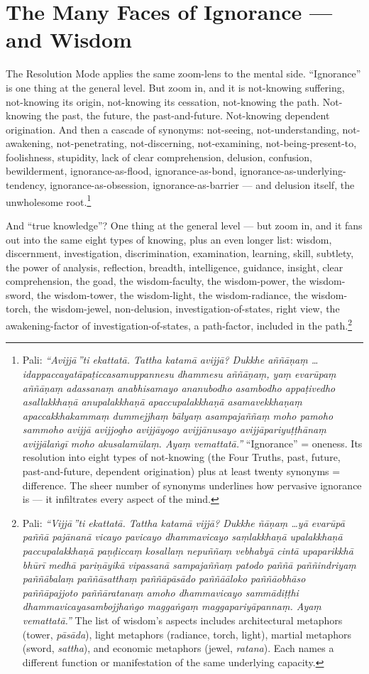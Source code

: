\section*{The Many Faces of Ignorance --- and Wisdom}

The Resolution Mode applies the same zoom-lens to the mental side. ``Ignorance'' is one thing at the general level. But zoom in, and it is not-knowing suffering, not-knowing its origin, not-knowing its cessation, not-knowing the path. Not-knowing the past, the future, the past-and-future. Not-knowing dependent origination. And then a cascade of synonyms: not-seeing, not-understanding, not-awakening, not-penetrating, not-discerning, not-examining, not-being-present-to, foolishness, stupidity, lack of clear comprehension, delusion, confusion, bewilderment, ignorance-as-flood, ignorance-as-bond, ignorance-as-underlying-tendency, ignorance-as-obsession, ignorance-as-barrier --- and delusion itself, the unwholesome root.\footnote{Pali: \textit{``Avijjā\,''ti ekattatā. Tattha katamā avijjā? Dukkhe aññāṇaṃ \ldots idappaccayatāpaṭiccasamuppannesu dhammesu aññāṇaṃ, yaṃ evarūpaṃ aññāṇaṃ adassanaṃ anabhisamayo ananubodho asambodho appaṭivedho asallakkhaṇā anupalakkhaṇā apaccupalakkhaṇā asamavekkhaṇaṃ apaccakkhakammaṃ dummejjhaṃ bālyaṃ asampajaññaṃ moho pamoho sammoho avijjā avijjogho avijjāyogo avijjānusayo avijjāpariyuṭṭhānaṃ avijjālaṅgī moho akusalamūlaṃ. Ayaṃ vemattatā.''} ``Ignorance'' = oneness. Its resolution into eight types of not-knowing (the Four Truths, past, future, past-and-future, dependent origination) plus at least twenty synonyms = difference. The sheer number of synonyms underlines how pervasive ignorance is --- it infiltrates every aspect of the mind.}

And ``true knowledge''? One thing at the general level --- but zoom in, and it fans out into the same eight types of knowing, plus an even longer list: wisdom, discernment, investigation, discrimination, examination, learning, skill, subtlety, the power of analysis, reflection, breadth, intelligence, guidance, insight, clear comprehension, the goad, the wisdom-faculty, the wisdom-power, the wisdom-sword, the wisdom-tower, the wisdom-light, the wisdom-radiance, the wisdom-torch, the wisdom-jewel, non-delusion, investigation-of-states, right view, the awakening-factor of investigation-of-states, a path-factor, included in the path.\footnote{Pali: \textit{``Vijjā\,''ti ekattatā. Tattha katamā vijjā? Dukkhe ñāṇaṃ \ldots yā evarūpā paññā pajānanā vicayo pavicayo dhammavicayo saṃlakkhaṇā upalakkhaṇā paccupalakkhaṇā paṇḍiccaṃ kosallaṃ nepuññaṃ vebhabyā cintā upaparikkhā bhūrī medhā pariṇāyikā vipassanā sampajaññaṃ patodo paññā paññindriyaṃ paññābalaṃ paññāsatthaṃ paññāpāsādo paññāāloko paññāobhāso paññāpajjoto paññāratanaṃ amoho dhammavicayo sammādiṭṭhi dhammavicayasambojjhaṅgo maggaṅgaṃ maggapariyāpannaṃ. Ayaṃ vemattatā.''} The list of wisdom's aspects includes architectural metaphors (tower, \textit{pāsāda}), light metaphors (radiance, torch, light), martial metaphors (sword, \textit{sattha}), and economic metaphors (jewel, \textit{ratana}). Each names a different function or manifestation of the same underlying capacity.}

